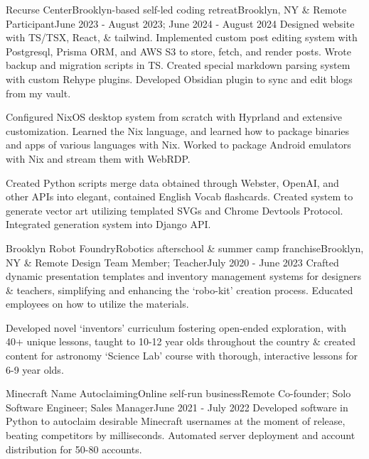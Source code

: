 \documentclass[letterpaper, 10pt]{article}
\begin{document}
	\resumeSubheading
	{Recurse Center}{Brooklyn-based self-led coding retreat}{Brooklyn, NY \& Remote}
	{Participant}{June 2023 - August 2023; June 2024 - August 2024}{}
	\resumeItemListStart
		{Designed website with TS/TSX, React, \& tailwind. Implemented custom post editing system with Postgresql, Prisma ORM, and AWS S3 to store, fetch, and render posts. Wrote backup and migration scripts in TS. Created special markdown parsing system with custom Rehype plugins. Developed Obsidian plugin to sync and edit blogs from my vault.}
    
    {Configured NixOS desktop system from scratch with Hyprland and extensive customization. Learned the Nix language, and learned how to package binaries and apps of various languages with Nix. Worked to package Android emulators with Nix and stream them with WebRDP.}
		
		{Created Python scripts merge data obtained through Webster, OpenAI, and other APIs into elegant, contained English Vocab flashcards. Created system to generate vector art utilizing templated SVGs and Chrome Devtools Protocol. Integrated generation system into Django API.}
	\resumeItemListEnd
	
	\resumeSubheading
	{Brooklyn Robot Foundry}{Robotics afterschool \& summer camp franchise}{Brooklyn, NY \& Remote}
	{Design Team Member; Teacher}{July 2020 - June 2023}{}
	\resumeItemListStart
		{Crafted dynamic presentation templates and inventory management systems for designers \& teachers, simplifying and enhancing the `robo-kit' creation process. Educated employees on how to utilize the materials.}
		
		{Developed novel `inventors' curriculum fostering open-ended exploration, with 40+ unique lessons, taught to 10-12 year olds throughout the country \& created content for astronomy `Science Lab' course with thorough, interactive lessons for 6-9 year olds.}
		
	\resumeItemListEnd
	
	\resumeSubheading
	{Minecraft Name Autoclaiming}{Online self-run business}{Remote}
	{Co-founder; Solo Software Engineer; Sales Manager}{June 2021 - July 2022}{}
	\resumeItemListStart
		{Developed software in Python to autoclaim desirable Minecraft usernames at the moment of release, beating competitors by milliseconds. Automated server deployment and account distribution for 50-80 accounts.}
		
\end{document}
